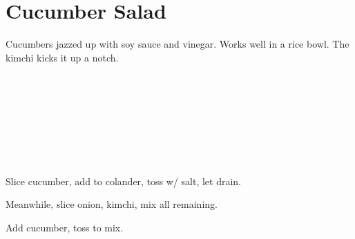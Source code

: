 \section{Cucumber Salad}

\begin{recipestats}[
        servings=4,
        preptime=15~\minute,
        source=Mike \& Jane,
        original=Emma \& Josh,
    ]
\end{recipestats}

\begin{recipeabstract}
    Cucumbers jazzed up with soy sauce and vinegar.
    Works well in a rice bowl.
    The kimchi kicks it up a notch.
\end{recipeabstract}

\begin{ingredientcolumns}[1]
    \begin{ingredientblock}
        \\
        \\
        \\
    \end{ingredientblock}
    \begin{ingredientblock}
        \\
        \\
        \\
    \end{ingredientblock}
\end{ingredientcolumns}

\begin{preparation}
\item Slice cucumber, add to colander, toss w/ salt, let drain.
\item Meanwhile, slice onion, kimchi, mix all remaining.
\item Add cucumber, toss to mix.
\end{preparation}

\recipeend%
